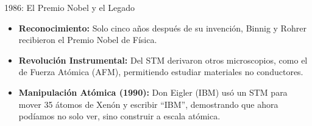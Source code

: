\begin{frame}{1986: El Premio Nobel y el Legado}
  \begin{itemize}
    \item \textbf{Reconocimiento:} Solo cinco años después de su invención,
      Binnig y Rohrer recibieron el Premio Nobel de Física.
    \item \textbf{Revolución Instrumental:} Del STM derivaron otros
      microscopios, como el de Fuerza Atómica (AFM), permitiendo estudiar
      materiales no conductores.
    \item \textbf{Manipulación Atómica (1990):} Don Eigler (IBM) usó un STM para
      mover 35 átomos de Xenón y escribir ``IBM'', demostrando que ahora podíamos
      no solo ver, sino construir a escala atómica.
  \end{itemize}
\end{frame}

